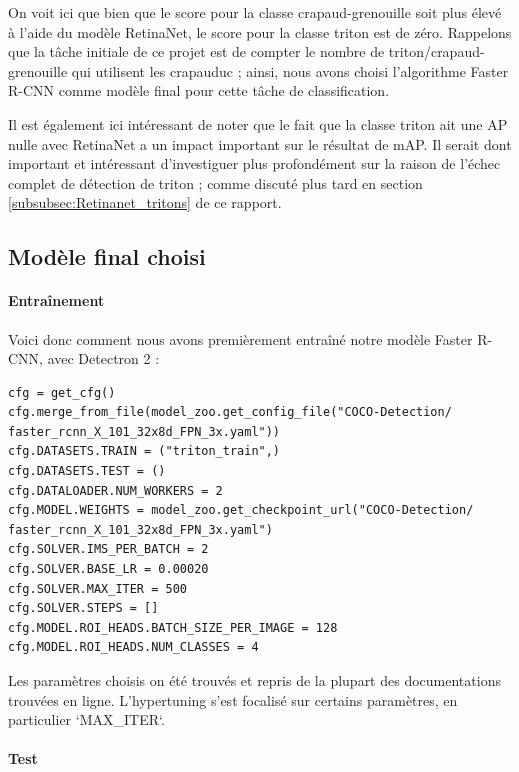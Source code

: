 On voit ici que bien que le score pour la classe crapaud-grenouille soit plus élevé à l'aide du modèle RetinaNet, le score pour la classe triton est de zéro. Rappelons que la tâche initiale de ce projet est de compter le nombre de triton/crapaud-grenouille qui utilisent les crapauduc ; ainsi, nous avons choisi l'algorithme Faster R-CNN comme modèle final pour cette tâche de classification.\newline

Il est également ici intéressant de noter que le fait que la classe triton ait une AP nulle avec RetinaNet a un impact important sur le résultat de mAP. Il serait dont important et intéressant d'investiguer plus profondément sur la raison de l'échec complet de détection de triton ; comme discuté plus tard en section \ref{subsubsec:Retinanet_tritons} de ce rapport.

\subsection{Modèle final choisi}\label{anal:final_model}

\paragraph{Entraînement}

Voici donc comment nous avons premièrement entraîné notre modèle Faster R-CNN, avec Detectron 2 : 

\lstset{language=Python}
\lstset{style=Python}
\begin{lstlisting}
cfg = get_cfg()
cfg.merge_from_file(model_zoo.get_config_file("COCO-Detection/
faster_rcnn_X_101_32x8d_FPN_3x.yaml"))
cfg.DATASETS.TRAIN = ("triton_train",)
cfg.DATASETS.TEST = ()
cfg.DATALOADER.NUM_WORKERS = 2
cfg.MODEL.WEIGHTS = model_zoo.get_checkpoint_url("COCO-Detection/
faster_rcnn_X_101_32x8d_FPN_3x.yaml")  
cfg.SOLVER.IMS_PER_BATCH = 2 
cfg.SOLVER.BASE_LR = 0.00020 
cfg.SOLVER.MAX_ITER = 500 
cfg.SOLVER.STEPS = []   
cfg.MODEL.ROI_HEADS.BATCH_SIZE_PER_IMAGE = 128  
cfg.MODEL.ROI_HEADS.NUM_CLASSES = 4 
\end{lstlisting}

Les paramètres choisis on été trouvés et repris de la plupart des documentations trouvées en ligne. L'hypertuning s'est focalisé sur certains paramètres, en particulier `MAX\_ITER`.


\paragraph{Test}

